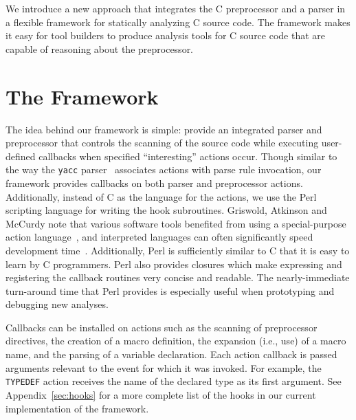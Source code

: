 \documentclass{article}
\newcommand{\pcp}{\mbox{\textsf{PCp}$^3$}}
\newcommand{\Perl}{\mbox{Perl}}
\newcommand{\C}{\mbox{C}}
\newcommand{\ie}{i.e.,}
\begin{document}
We introduce a new approach that integrates the \C{} preprocessor and a
parser in a flexible framework for statically analyzing \C{}
source code.  The framework makes it easy for tool builders to produce
analysis tools for \C{} source code that are capable of reasoning about the
preprocessor.



\section{The Framework}
\label{sec:framework}

The idea behind our framework is simple: provide an integrated parser
and preprocessor that controls the scanning of the source code while
executing user-defined callbacks when specified ``interesting'' actions occur.
Though similar to the way the \texttt{yacc} parser~\cite{Levine92}
associates actions with parse rule invocation, our framework provides
callbacks on both parser and preprocessor actions. Additionally,
instead of \C{} as the language for the actions, we use the \Perl{} scripting
language for writing the hook subroutines.  Griswold, Atkinson and McCurdy note
that various software tools benefited from using a special-purpose
action language~\cite{Griswold96}, and interpreted languages can
often significantly speed development time~\cite{Scripting}.
Additionally, \Perl{} is sufficiently similar to \C{} that it is easy to 
learn by \C{} programmers.  \Perl{} also provides closures which make
expressing and registering the callback routines very concise and
readable. The nearly-immediate turn-around time that
\Perl{} provides is especially useful when prototyping and debugging new 
analyses.


Callbacks can be installed on actions such as the scanning of preprocessor directives, the
creation of a macro definition, the expansion (\ie{} use) of a macro
name, and the parsing of a variable declaration.  Each action callback
is passed arguments relevant to the event for which it was invoked.  For
example, the \texttt{TYPEDEF} action receives the name of the declared
type as its first argument.  See Appendix~\ref{sec:hooks} for a more complete list of
the hooks in our current implementation of the framework.
\end{document}
